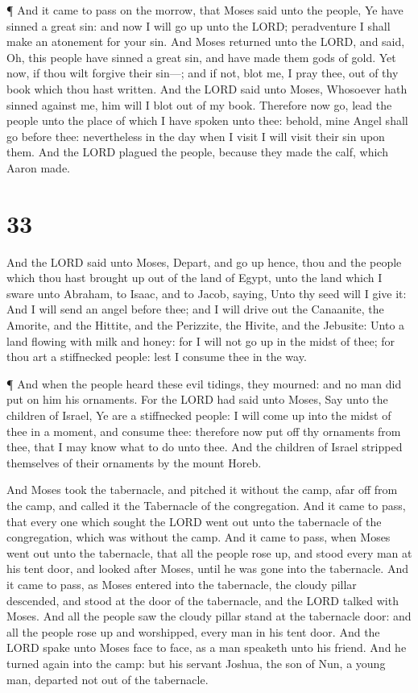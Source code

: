  ¶ And it came to pass on the morrow, that Moses said unto
the people, Ye have sinned a great sin: and now I will go up unto the
LORD; peradventure I shall make an atonement for your sin. 
And Moses returned unto the LORD, and said, Oh, this people have sinned
a great sin, and have made them gods of gold.  Yet now, if
thou wilt forgive their sin---; and if not, blot me, I pray thee, out of
thy book which thou hast written.  And the LORD said unto
Moses, Whosoever hath sinned against me, him will I blot out of my book.
 Therefore now go, lead the people unto the place of which
I have spoken unto thee: behold, mine Angel shall go before thee:
nevertheless in the day when I visit I will visit their sin upon them.
 And the LORD plagued the people, because they made the
calf, which Aaron made.

\hypertarget{section-32}{%
\section{33}\label{section-32}}

 And the LORD said unto Moses, Depart, and go up hence, thou
and the people which thou hast brought up out of the land of Egypt, unto
the land which I sware unto Abraham, to Isaac, and to Jacob, saying,
Unto thy seed will I give it:  And I will send an angel
before thee; and I will drive out the Canaanite, the Amorite, and the
Hittite, and the Perizzite, the Hivite, and the Jebusite: 
Unto a land flowing with milk and honey: for I will not go up in the
midst of thee; for thou art a stiffnecked people: lest I consume thee in
the way.

 ¶ And when the people heard these evil tidings, they
mourned: and no man did put on him his ornaments.  For the
LORD had said unto Moses, Say unto the children of Israel, Ye are a
stiffnecked people: I will come up into the midst of thee in a moment,
and consume thee: therefore now put off thy ornaments from thee, that I
may know what to do unto thee.  And the children of Israel
stripped themselves of their ornaments by the mount Horeb.

 And Moses took the tabernacle, and pitched it without the
camp, afar off from the camp, and called it the Tabernacle of the
congregation. And it came to pass, that every one which sought the LORD
went out unto the tabernacle of the congregation, which was without the
camp.  And it came to pass, when Moses went out unto the
tabernacle, that all the people rose up, and stood every man at his tent
door, and looked after Moses, until he was gone into the tabernacle.
 And it came to pass, as Moses entered into the tabernacle,
the cloudy pillar descended, and stood at the door of the tabernacle,
and the LORD talked with Moses.  And all the people saw the
cloudy pillar stand at the tabernacle door: and all the people rose up
and worshipped, every man in his tent door.  And the LORD
spake unto Moses face to face, as a man speaketh unto his friend. And he
turned again into the camp: but his servant Joshua, the son of Nun, a
young man, departed not out of the tabernacle.

